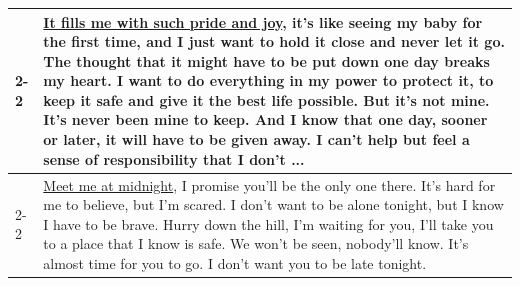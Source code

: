 \begin{table}[t]
{\begin{tabular}{p{0.8cm}|p{9.8cm}}
        \cmidrule{2-2}
          & \underline{It fills me with such pride and joy}, it’s like seeing my baby for the first time, and I just want to hold it close and never let it go. The thought that it might have to be put down one day breaks my heart. I want to do everything in my power to protect it, to keep it safe and give it the best life possible. But it’s not mine. It’s never been mine to keep. And I know that one day, sooner or later, it will have to be given away. I can’t help but feel a sense of responsibility that I don’t ... \\
        \cmidrule{2-2}
         & \underline{Meet me at midnight}, I promise you'll be the only one there. It's hard for me to believe, but I'm scared. I don't want to be alone tonight, but I know I have to be brave. Hurry down the hill, I'm waiting for you, I'll take you to a place that I know is safe. We won't be seen, nobody'll know. It's almost time for you to go. I don't want you to be late tonight. \\

        \bottomrule
    \end{tabular}
    }
\end{table}


